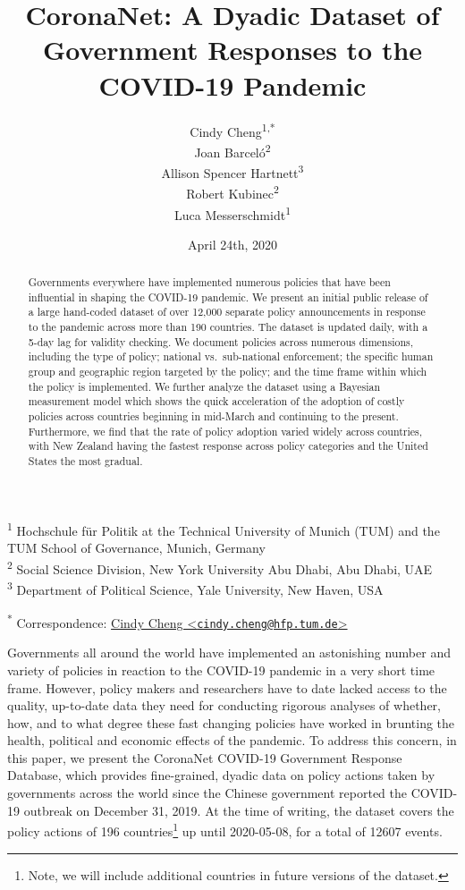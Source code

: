 \documentclass[]{article}
\title{CoronaNet: A Dyadic Dataset of Government Responses to the COVID-19 Pandemic}
\author{Cindy Cheng\textsuperscript{1,*} \\ Joan Barceló\textsuperscript{2} \\ Allison Spencer Hartnett\textsuperscript{3} \\ Robert Kubinec\textsuperscript{2} \\ Luca Messerschmidt\textsuperscript{1}}
\date{April 24th, 2020}
\let\rmarkdownfootnote\footnote%
\def\footnote{\protect\rmarkdownfootnote}
\begin{document}
\maketitle
\begin{abstract}
Governments everywhere have implemented numerous policies that have been influential in shaping the COVID-19 pandemic. We present an initial public release of a large hand-coded dataset of over 12,000 separate policy announcements in response to the pandemic across more than 190 countries. The dataset is updated daily, with a 5-day lag for validity checking. We document policies across numerous dimensions, including the type of policy; national vs.~sub-national enforcement; the specific human group and geographic region targeted by the policy; and the time frame within which the policy is implemented. We further analyze the dataset using a Bayesian measurement model which shows the quick acceleration of the adoption of costly policies across countries beginning in mid-March and continuing to the present. Furthermore, we find that the rate of policy adoption varied widely across countries, with New Zealand having the fastest response across policy categories and the United States the most gradual.
\end{abstract}

\textsuperscript{1} Hochschule für Politik at the Technical University of Munich (TUM) and the TUM School of Governance, Munich, Germany\\
\textsuperscript{2} Social Science Division, New York University Abu Dhabi, Abu Dhabi, UAE\\
\textsuperscript{3} Department of Political Science, Yale University, New Haven, USA

\textsuperscript{*} Correspondence: \href{mailto:cindy.cheng@hfp.tum.de}{Cindy Cheng \textless{}\href{mailto:cindy.cheng@hfp.tum.de}{\nolinkurl{cindy.cheng@hfp.tum.de}}\textgreater{}}

\newpage

Governments all around the world have implemented an astonishing number and variety of policies in reaction to the COVID-19 pandemic in a very short time frame. However, policy makers and researchers have to date lacked access to the quality, up-to-date data they need for conducting rigorous analyses of whether, how, and to what degree these fast changing policies have worked in brunting the health, political and economic effects of the pandemic. To address this concern, in this paper, we present the CoronaNet COVID-19 Government Response Database, which provides fine-grained, dyadic data on policy actions taken by governments across the world since the Chinese government reported the COVID-19 outbreak on December 31, 2019. At the time of writing, the dataset covers the policy actions of 196 countries\footnote{Note, we will include additional countries in future versions of the dataset.} up until 2020-05-08, for a total of 12607 events.
\end{document}
